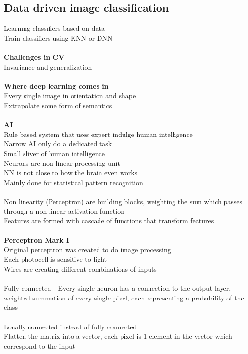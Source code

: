 \documentclass[11pt]{article}
\begin{document}
\subsection*{Data driven image classification}
Learning classifiers based on data\\
Train classifiers using KNN or DNN\\\\
\textbf{Challenges in CV}\\
Invariance and generalization
\\\\
\textbf{Where deep learning comes in}\\
Every single image in orientation and shape\\
Extrapolate some form of semantics\\
\\
\textbf{AI}\\
Rule based system that uses expert indulge human intelligence
\\
Narrow AI only do a dedicated task\\
Small sliver of human intelligence
\\
Neurons are non linear processing unit
\\
NN is not close to how the brain even works
\\
Mainly done for statistical pattern recognition
\\\\
Non linearity (Perceptron) are building blocks, weighting the sum which passes through a non-linear activation function
\\
Features are formed with cascade of functions that transform features
\\\\
\textbf{Perceptron Mark I}\\
Original perceptron was created to do image processing\\
Each photocell is sensitive to light\\
Wires are creating different combinations of inputs\\\\
Fully connected - Every single neuron has a connection to the output layer, weighted summation of every single pixel, each representing a probability of the class\\
\\
Locally connected instead of fully connected
\\
Flatten the matrix into a vector, each pixel is 1 element in the vector which correspond to the input	
\end{document}
